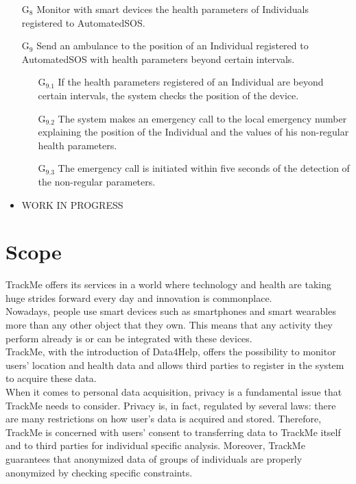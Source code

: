 \documentclass{report}
\newcommand{\subs}[1]{\ensuremath{_{\textrm{#1}}}}
\begin{document}
\begin{itemize}
				\item[G\subs{8}]Monitor with smart devices the health parameters of Individuals registered to AutomatedSOS.
					
				\item[G\subs{9}]Send an ambulance to the position of an Individual registered to AutomatedSOS with health parameters beyond certain intervals.
					\begin{itemize}
						\item[G\subs{9.1}]If the health parameters registered of an Individual are beyond certain intervals, the system checks the position of the device.
						\item[G\subs{9.2}]The system makes an emergency call to the local emergency number explaining the position of the Individual and the values of his non-regular health parameters.
						\item[G\subs{9.3}]The emergency call is initiated within five seconds of the detection of the non-regular parameters.
					\end{itemize}


				\item WORK IN PROGRESS
			\end{itemize}

		\section{Scope}
			TrackMe offers its services in a world where technology and health are taking huge strides forward every day and innovation is commonplace.\\
Nowadays, people use smart devices such as smartphones and smart wearables more than any other object that they own. This means that any activity they perform already is or can be integrated with these devices.\\
TrackMe, with the introduction of Data4Help, offers the possibility to monitor users’ location and health data and allows third parties to register in the system to acquire these data.\\

When it comes to personal data acquisition, privacy is a fundamental issue that TrackMe needs to consider. Privacy is, in fact, regulated by several laws: there are many restrictions on how user’s data is acquired and stored. Therefore, TrackMe is concerned with users’ consent to transferring data to TrackMe itself and to third parties for individual specific analysis. Moreover, TrackMe guarantees that anonymized data of groups of individuals are properly anonymized by checking specific constraints.\\
\end{document}
